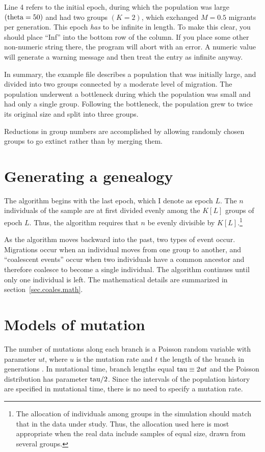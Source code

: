 Line 4 refers to the initial epoch, during which the population was
large $(\hbox{theta}=50)$ and had two groups $(K=2)$, which exchanged
$M=0.5$ migrants per generation.  This epoch \emph{has} to be infinite
in length.  To make this clear, you should place ``Inf'' into the
bottom row of the  column.  If you place some other
non-numeric string there, the program will abort with an error.  A
numeric value will generate a warning message and then treat the entry
as infinite anyway.

In summary, the example  file describes a population
that was initially large, and divided into two groups connected by a
moderate level of migration.  The population underwent a bottleneck
during which the population was small and had only a single group.
Following the bottleneck, the population grew to twice its original
size and split into three groups.

Reductions in group numbers are accomplished by allowing randomly
chosen groups to go extinct rather than by merging them.

\section{Generating a genealogy}

The algorithm begins with the last epoch, which I denote as epoch $L$.
The $n$ individuals of the sample are at first divided evenly among
the $K[L]$ groups of epoch $L$.  Thus, the algorithm requires that $n$
be evenly divisible by $K[L]$.\footnote{The allocation of individuals
among groups in the simulation should match that in the data under
study.  Thus, the allocation used here is most appropriate when the
real data include samples of equal size, drawn from several groups.}

As the algorithm moves backward into the past, two types of event
occur.  Migrations occur when an individual moves from one group to
another, and ``coalescent events'' occur when two individuals have a
common ancestor and therefore coalesce to become a single individual.
The algorithm continues until only one individual is left.  The
mathematical details are summarized in
section~\ref{sec.coales.math}.

\section{Models of mutation\label{sec.mutation}}

The number of mutations along each branch is a Poisson random variable
with parameter $ut$, where $u$ is the mutation rate and $t$ the
length of the branch in generations \cite{Kimura:TPB-2-174}.  In
mutational time, branch lengths equal $\hbox{tau} \equiv 2ut$ and the
Poisson distribution has parameter $\hbox{tau}/2$.  Since the intervals of
the population history are specified in mutational time, there is no
need to specify a mutation rate.

